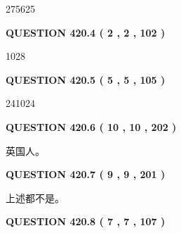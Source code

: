 \documentclass{ctexart}
\begin{document}
  
 
 
\noindent{}

275625
 
 
  
\vspace{0.2in}
  
{\textbf{\Large{QUESTION
420.4 
 ( 2 , 2 , 102 )
}}}
  
  
 
 
\noindent{}

1028
 
 
  
\vspace{0.2in}
  
{\textbf{\Large{QUESTION
420.5 
 ( 5 , 5 , 105 )
}}}
  
  
 
 
\noindent{}

241024
 
 
  
\vspace{0.2in}
  
{\textbf{\Large{QUESTION
420.6 
 ( 10 , 10 , 202 )
}}}
  
  
 
 
\noindent{}
 
 
英国人。
 
 
 
 
  
\vspace{0.2in}
  
{\textbf{\Large{QUESTION
420.7 
 ( 9 , 9 , 201 )
}}}
  
  
 
 
\noindent{}
 
 
 上述都不是。
 
 
 
 
  
\vspace{0.2in}
  
{\textbf{\Large{QUESTION
420.8 
 ( 7 , 7 , 107 )
}}}
  
  
 
 
\noindent{}
\end{document}
